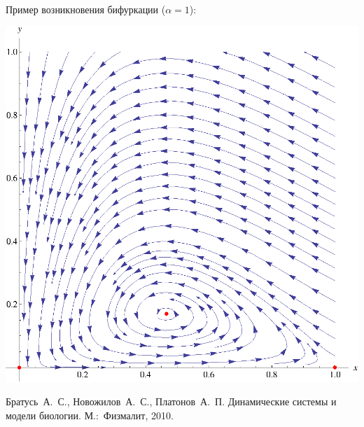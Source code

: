 \documentclass[11pt]{article}
\begin{document}
Пример возникновения бифуркации ($\alpha = 1$):

\includegraphics[scale=1.0]{pics/bifur.eps}

\pagebreak
{}
\begin{thebibliography}{99}
 Братусь~А.~С., Новожилов~А.~С., Платонов~А.~П. Динамические системы и модели биологии. М.:~Физмалит, 2010.
\end{thebibliography}
\end{document}
